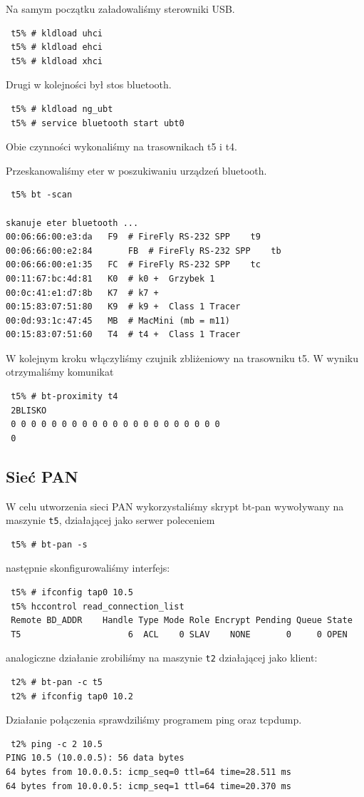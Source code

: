\documentclass[a4paper,11pt,notitlepage]{article}
\begin{document}
Na samym początku załadowaliśmy sterowniki USB.
\begin{verbatim}
 t5% # kldload uhci
 t5% # kldload ehci
 t5% # kldload xhci
\end{verbatim}
Drugi w kolejności był stos bluetooth.
\begin{verbatim}
 t5% # kldload ng_ubt
 t5% # service bluetooth start ubt0
\end{verbatim}
Obie czynności wykonaliśmy na trasownikach t5 i t4.

Przeskanowaliśmy eter w poszukiwaniu urządzeń bluetooth.
\begin{verbatim}
 t5% bt -scan

skanuje eter bluetooth ...
00:06:66:00:e3:da	F9	# FireFly RS-232 SPP 	t9
00:06:66:00:e2:84       FB	# FireFly RS-232 SPP 	tb
00:06:66:00:e1:35	FC	# FireFly RS-232 SPP	tc
00:11:67:bc:4d:81	K0	# k0 +	Grzybek 1
00:0c:41:e1:d7:8b	K7	# k7 +
00:15:83:07:51:80	K9	# k9 +	Class 1 Tracer
00:0d:93:1c:47:45	MB	# MacMini (mb = m11)
00:15:83:07:51:60	T4	# t4 +	Class 1 Tracer
\end{verbatim}

W kolejnym kroku włączyliśmy czujnik zbliżeniowy na trasowniku t5.
W wyniku otrzymaliśmy komunikat
\begin{verbatim}
 t5% # bt-proximity t4
 2BLISKO
 0 0 0 0 0 0 0 0 0 0 0 0 0 0 0 0 0 0 0 0 0
 0
\end{verbatim}

\subsection{Sieć PAN}

W celu utworzenia sieci PAN wykorzystaliśmy skrypt bt-pan wywoływany na maszynie \verb+t5+, działającej jako serwer poleceniem 
\begin{verbatim}
 t5% # bt-pan -s
\end{verbatim}
następnie skonfigurowaliśmy interfejs:
\begin{verbatim}
 t5% # ifconfig tap0 10.5
 t5% hccontrol read_connection_list
 Remote BD_ADDR    Handle Type Mode Role Encrypt Pending Queue State
 T5                     6  ACL    0 SLAV    NONE       0     0 OPEN
\end{verbatim}
analogiczne działanie zrobiliśmy na maszynie \verb+t2+ działającej jako klient:
\begin{verbatim}
 t2% # bt-pan -c t5
 t2% # ifconfig tap0 10.2
\end{verbatim}
Działanie połączenia sprawdziliśmy programem ping oraz tcpdump.
\begin{verbatim}
 t2% ping -c 2 10.5
PING 10.5 (10.0.0.5): 56 data bytes
64 bytes from 10.0.0.5: icmp_seq=0 ttl=64 time=28.511 ms
64 bytes from 10.0.0.5: icmp_seq=1 ttl=64 time=20.370 ms
\end{verbatim}
\end{document}
